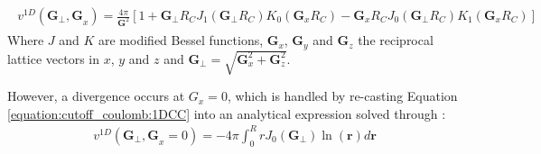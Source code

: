 \documentclass[letterpaper,10pt,english]{sphinxmanual}
\begin{document}
\label{\detokenize{cutoff_coulomb:equation-1dcc}}\begin{equation}\label{equation:cutoff_coulomb:1DCC}
\begin{split}\begin{aligned}
    v^{1D}(\mathbf{G_{\bot}, G}_x) =  \frac{4 \pi}{\mathbf{G}^2}  [1 + \mathbf{G}_{\bot}R_C J_1 (\mathbf{G}_{\bot}R_C) K_{0}(\mathbf{G}_x R_C)
    - \mathbf{G}_x R_C J_{0}(\mathbf{G}_{\bot}R_C) K_{1}(\mathbf{G}_x R_C) ]
    \end{aligned}\end{split}
\end{equation}
Where \(J\) and \(K\) are modified Bessel functions,
\(\mathbf{G}_x\), \(\mathbf{G}_y\) and \(\mathbf{G}_z\) the
reciprocal lattice vectors in \(x\), \(y\) and \(z\) and
\(\mathbf{G}_{\bot} = \sqrt{\mathbf{G}_x^2 + \mathbf{G}_z^2}\).

However, a divergence occurs at \(G_x = 0\), which is handled by
re-casting Equation \eqref{equation:cutoff_coulomb:1DCC} into an analytical expression solved through
:
\begin{equation*}
\begin{split}v^{1D}(\mathbf{G_{\bot}, G}_x = 0) =  - 4 \pi  \int_{0}^{R} r J_{0}(\mathbf{G}_{\bot})\ln{(\mathbf{r})} d \mathbf{r}\end{split}
\end{equation*}
\end{document}

